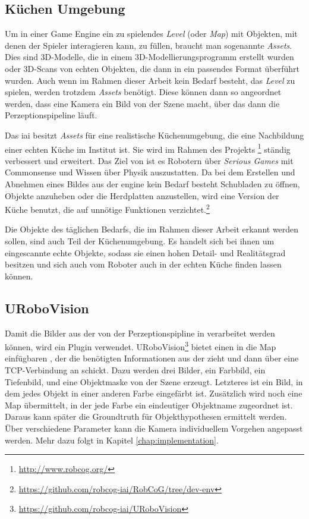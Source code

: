 \subsection{Küchen Umgebung}
\label{subsec:kitchenenvironment}
Um in einer Game Engine ein zu spielendes \textit{Level} (oder \textit{Map}) mit Objekten, mit denen der Spieler interagieren kann, zu füllen, braucht man sogenannte \textit{Assets}. Dies sind 3D-Modelle, die in einem 3D-Modellierungsprogramm erstellt wurden oder 3D-Scans von echten Objekten, die dann in ein passendes Format überführt wurden. Auch wenn im Rahmen dieser Arbeit kein Bedarf besteht, das \textit{Level} zu spielen, werden trotzdem \textit{Assets} benötigt. Diese können dann so angeordnet werden, dass eine Kamera ein Bild von der Szene macht, über das dann die Perzeptionspipeline läuft. \par
Das \gls{iai} besitzt \textit{Assets} für eine realistische Küchenumgebung, die eine Nachbildung einer echten Küche im Institut ist. Sie wird im Rahmen des Projekts \robcog\footnote{\url{http://www.robcog.org/}} ständig verbessert und erweitert. Das Ziel von \robcog ist es Robotern über \textit{Serious Games} mit Commonsense und Wissen über Physik auszustatten. Da bei dem Erstellen und Abnehmen eines Bildes aus der \acrshort{engine} kein Bedarf besteht Schubladen zu öffnen, Objekte anzuheben oder die Herdplatten anzustellen, wird eine Version der Küche benutzt, die auf unnötige Funktionen verzichtet.\footnote{\url{https://github.com/robcog-iai/RobCoG/tree/dev-env}} \par
Die Objekte des täglichen Bedarfs, die im Rahmen dieser Arbeit erkannt werden sollen, sind auch Teil der Küchenumgebung. Es handelt sich bei ihnen um eingescannte echte Objekte, sodass sie einen hohen Detail- und Realitätsgrad besitzen und sich auch vom Roboter auch in der echten Küche finden lassen können.
 
\subsection{URoboVision}
\label{subsec:urobovision}
Damit die Bilder aus der \unreal von der Perzeptionspipline in \robosherlock verarbeitet werden können, wird ein \unreal Plugin verwendet. URoboVision\footnote{\url{https://github.com/robcog-iai/URoboVision}} bietet einen in die Map einfügbaren , der die benötigten Informationen aus der \unreal zieht und dann über eine TCP-Verbindung an \robosherlock schickt.  Dazu werden drei Bilder, ein Farbbild, ein Tiefenbild, und eine Objektmaske von der Szene erzeugt. Letzteres ist ein Bild, in dem jedes Objekt in einer anderen Farbe eingefärbt ist. Zusätzlich wird noch eine Map übermittelt, in der jede Farbe ein eindeutiger Objektname zugeordnet ist. Daraus kann später die Groundtruth für Objekthypothesen  ermittelt werden. Über verschiedene Parameter kann die Kamera individuellem Vorgehen angepasst werden. Mehr dazu folgt in Kapitel \ref{chap:implementation}. \par 

